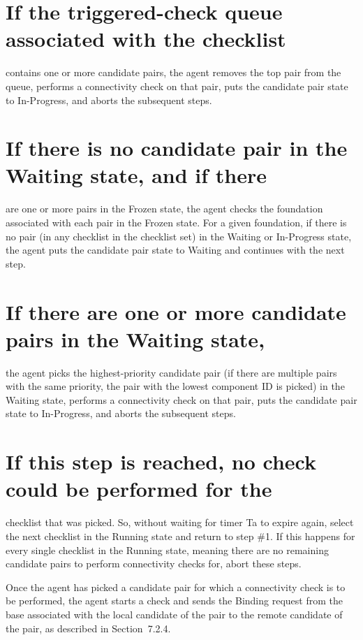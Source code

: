 \documentclass{article}
\begin{document}
\section{If the triggered-check queue associated with the checklist}

contains one or more candidate pairs, the agent removes the top pair from the queue, performs a connectivity check on that pair, puts the candidate pair state to In-Progress, and aborts the subsequent steps.

\section{If there is no candidate pair in the Waiting state, and if there}

are one or more pairs in the Frozen state, the agent checks the foundation associated with each pair in the Frozen state.  For a given foundation, if there is no pair (in any checklist in the checklist set) in the Waiting or In-Progress state, the agent puts the candidate pair state to Waiting and continues with the next step.

\section{If there are one or more candidate pairs in the Waiting state,}

the agent picks the highest-priority candidate pair (if there are multiple pairs with the same priority, the pair with the lowest component ID is picked) in the Waiting state, performs a connectivity check on that pair, puts the candidate pair state to In-Progress, and aborts the subsequent steps.

\section{If this step is reached, no check could be performed for the}

checklist that was picked.  So, without waiting for timer Ta to expire again, select the next checklist in the Running state and return to step \#1.  If this happens for every single checklist in the Running state, meaning there are no remaining candidate pairs to perform connectivity checks for, abort these steps.

Once the agent has picked a candidate pair for which a connectivity check is to be performed, the agent starts a check and sends the Binding request from the base associated with the local candidate of the pair to the remote candidate of the pair, as described in Section~7.2.4.
\end{document}

